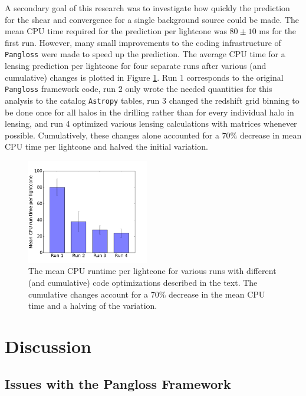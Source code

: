 \documentclass[%
 reprint,
 amsmath,amssymb,
 aps,nofootinbib
]{revtex4-1}
\begin{document}
A secondary goal of this research was to investigate how quickly the prediction for the shear and convergence for a single background source could be made. The mean CPU time required for the prediction per lightcone was ${80\pm10}$ ms for the first run. However, many small improvements to the coding infrastructure of \texttt{Pangloss} were made to speed up the prediction. The average CPU time for a lensing prediction per lightcone for four separate runs after various (and cumulative) changes is plotted in Figure \ref{cpu_plot}. Run 1 corresponds to the original \texttt{Pangloss} framework code, run 2 only wrote the needed quantities for this analysis to the catalog \texttt{Astropy} tables, run 3 changed the redshift grid binning to be done once for all halos in the drilling rather than for every individual halo in lensing, and run 4 optimized various lensing calculations with matrices whenever possible. Cumulatively, these changes alone accounted for a 70\% decrease in mean CPU time per lightcone and halved the initial variation.

\begin{figure}
    \centering
    \includegraphics[width=0.475\textwidth]{figs-swe/profile_bar.png}
    \captionsetup{justification=raggedright,singlelinecheck=false}
    \caption{The mean CPU runtime per lightcone for various runs with different (and cumulative) code optimizations described in the text. The cumulative changes account for a 70\% decrease in the mean CPU time and a halving of the variation.}
    \label{cpu_plot}
\end{figure}

\section{Discussion}

\subsection*{Issues with the Pangloss Framework}
\end{document}
